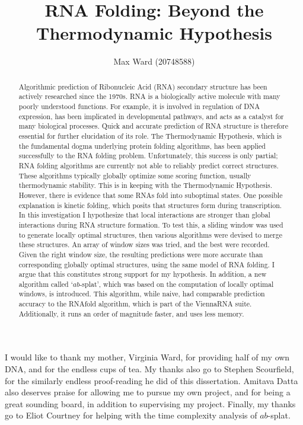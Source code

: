 \documentclass{cshonours}
\title{RNA Folding: Beyond the Thermodynamic Hypothesis}
\author{Max Ward (20748588)}
\begin{document}
\maketitle

\begin{abstract}
Algorithmic prediction of Ribonucleic Acid (RNA) secondary structure has been actively researched since the 1970s. RNA is a biologically active molecule with many poorly understood functions. For example, it is involved in regulation of DNA expression, has been implicated in developmental pathways, and acts as a catalyst for many biological processes. Quick and accurate prediction of RNA structure is therefore essential for further elucidation of its role. The Thermodynamic Hypothesis, which is the fundamental dogma underlying protein folding algorithms, has been applied successfully to the RNA folding problem. Unfortunately, this success is only partial; RNA folding algorithms are currently not able to reliably predict correct structures. These algorithms typically globally optimize some scoring function, usually thermodynamic stability. This is in keeping with the Thermodynamic Hypothesis. However, there is evidence that some RNAs fold into suboptimal states. One possible explanation is kinetic folding, which posits that structures form during transcription. In this investigation I hypothesize that local interactions are stronger than global interactions during RNA structure formation. To test this, a sliding window was used to generate locally optimal structures, then various algorithms were devised to merge these structures. An array of window sizes was tried, and the best were recorded. Given the right window size, the resulting predictions were more accurate than corresponding globally optimal structures, using the same model of RNA folding. I argue that this constitutes strong support for my hypothesis. In addition, a new algorithm called `$ab$-splat', which was based on the computation of locally optimal windows, is introduced. This algorithm, while  naive, had comparable prediction accuracy to the RNAfold algorithm, which is part of the ViennaRNA suite. Additionally, it runs an order of magnitude faster, and uses less memory.
\end{abstract}

\begin{acknowledgements}
I would like to thank my mother, Virginia Ward, for providing half of my own DNA, and for the endless cups of tea. My thanks also go to Stephen Scourfield, for the similarly endless proof-reading he did of this dissertation. Amitava Datta also deserves praise for allowing me to pursue my own project, and for being a great sounding board, in addition to supervising my project. Finally, my thanks go to Eliot Courtney for helping with the time complexity analysis of $ab$-splat.
\end{acknowledgements}
\end{document}
